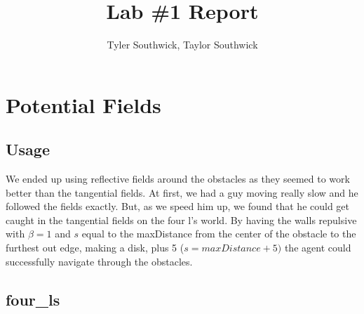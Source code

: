 \documentclass[11pt]{article}
\begin{document}
\title{Lab \#1 Report}

\author{Tyler Southwick, Taylor Southwick}

\date{}

\maketitle

\section{Potential Fields}
\subsection{Usage}

We ended up using reflective fields around the obstacles as they seemed to work better than the tangential fields.
At first, we had a guy moving really slow and he followed the fields exactly.
But, as we speed him up, we found that he could get caught in the tangential fields on the four l's world.
By having the walls repulsive with $\beta = 1$ and $s$ equal to the maxDistance from the center of the obstacle to the furthest out edge, making a disk, plus 5 ($s=maxDistance + 5)$ the agent could successfully navigate through the obstacles.

\subsection{four\_ls}
\end{document}
